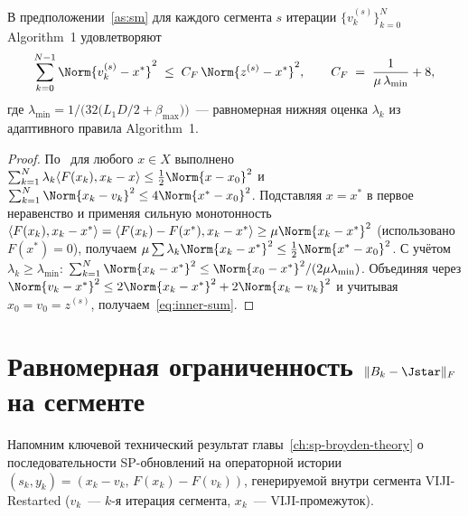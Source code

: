 \begin{lemma}\label{lem:inner-sum}
В предположении~\ref{as:sm} для каждого сегмента $s$ итерации
$\{v_k^{(s)}\}_{k=0}^{N}$ Algorithm~1 \cite{Agafonov2024VIJI} удовлетворяют
\begin{equation}
\sum_{k=0}^{N-1} \Norm{v_k^{(s)} - x^{*}}^{2}
\;\le\; C_F\,\Norm{z^{(s)} - x^{*}}^{2},
\qquad
C_F \;=\; \frac{1}{\mu\,\lambda_{\min}} + 8,
\label{eq:inner-sum}
\end{equation}
где $\lambda_{\min} = 1/\bigl(32\bigl(L_1 D/2 + \beta_{\max}\bigr)\bigr)$~---
равномерная нижняя оценка $\lambda_k$ из адаптивного правила Algorithm~1.
\end{lemma}

\begin{proof}
По~\cite[Lemma~B.2]{Agafonov2024VIJI} для любого $x \in X$ выполнено
$\sum_{k=1}^{N} \lambda_k \langle F(x_k), x_k - x\rangle \le
\tfrac{1}{2}\Norm{x-x_0}^{2}$ и
$\sum_{k=1}^{N} \Norm{x_k - v_k}^{2} \le 4\Norm{x^{*}-x_0}^{2}$.
Подставляя $x = x^{*}$ в первое неравенство и применяя
сильную монотонность $\langle F(x_k), x_k - x^{*}\rangle =
\langle F(x_k) - F(x^{*}), x_k - x^{*}\rangle \ge \mu\Norm{x_k - x^{*}}^{2}$
(использовано $F(x^{*})=0$), получаем
$\mu\sum \lambda_k \Norm{x_k-x^{*}}^{2} \le \tfrac{1}{2}\Norm{x^{*}-x_0}^{2}$.
С учётом $\lambda_k \ge \lambda_{\min}$:
$\sum_{k=1}^{N}\Norm{x_k-x^{*}}^{2} \le \Norm{x_0-x^{*}}^{2}/(2\mu\lambda_{\min})$.
Объединяя через $\Norm{v_k-x^{*}}^{2} \le 2\Norm{x_k-x^{*}}^{2}+2\Norm{x_k-v_k}^{2}$
и учитывая $x_0 = v_0 = z^{(s)}$, получаем~\eqref{eq:inner-sum}.
\end{proof}

\section{Равномерная ограниченность $\|B_k - \Jstar\|_F$ на сегменте}
\label{sec:viji:sp-bd}

Напомним ключевой технический результат главы~\ref{ch:sp-broyden-theory}
о последовательности SP-обновлений на операторной истории
$(s_k, y_k) = (x_k - v_k,\, F(x_k) - F(v_k))$, генерируемой
внутри сегмента VIJI-Restarted ($v_k$~--- $k$-я итерация сегмента,
$x_k$~--- VIJI-промежуток).

